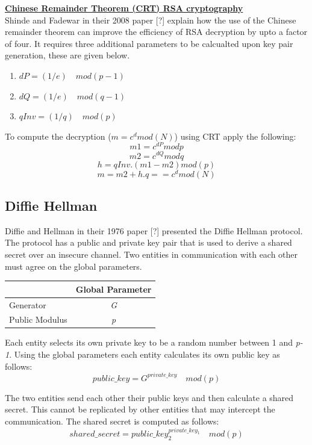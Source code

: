 \documentclass[bsc,frontabs,twoside,singlespacing,parskip,deptreport]{infthesis}     %
\begin{document}
\underline{\textbf{Chinese Remainder Theorem (CRT) RSA cryptography}}\\

Shinde and Fadewar in their 2008 paper [?] explain how the use of the Chinese remainder theorem can improve the efficiency of RSA decryption by upto a factor of four. It requires three additional parameters to be calcualted upon key pair generation, these are given below.
\begin{enumerate}
\item $dP = (1/e)\quad  mod (p-1)$
\item $dQ = (1/e) \quad mod (q-1)$
\item $qInv = (1/q) \quad mod (p)$
\end{enumerate}

To compute the decryption ($m= c^d mod(N)$) using CRT apply the following:
$$m1 = c^{dP} mod p$$
$$m2 = c^{dQ} mod q$$
$$h = qInv.(m1 - m2) mod (p)$$
$$ m = m2 + h.q  == c^d mod (N)$$


\subsection{Diffie Hellman}
Diffie and Hellman in their 1976 paper [?] presented the Diffie Hellman protocol. The protocol has a public and private key pair that is used to derive a shared secret over an insecure channel. Two entities in communication with each other must agree on the global parameters.

\begin{table}[H]
\begin{tabular}{|l|c|}
\hline
 & Global Parameter\\
\hline
Generator & \textit{G}\\
\hline
Public Modulus & \textit{p}\\
\hline
\end{tabular}
\end{table}

Each entity selects its own private key to be a random number between 1 and \textit{p-1}. Using the global parameters each entity calculates its own public key as follows:
$$ public\_key = G^{private\_key} \quad mod (p)$$

The two entities send each other their public keys and then calculate a shared secret. This cannot be replicated by other entities that may intercept the communication. The shared secret is computed as follows:
$$ shared\_secret = public\_key_2^{private\_key_1} \quad mod (p) $$
\end{document}
